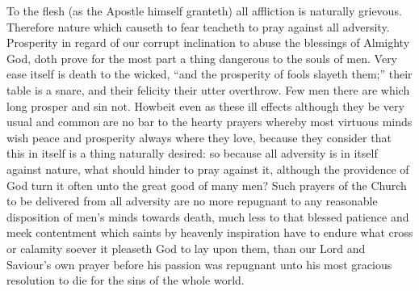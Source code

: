 To the flesh (as the Apostle himself granteth) all affliction is naturally grievous. Therefore nature which causeth to fear teacheth to pray against all adversity. Prosperity in regard of our corrupt inclination to abuse the blessings of Almighty God, doth prove for the most part a thing dangerous to the souls of men. Very ease itself is death to the wicked, “and the prosperity of fools slayeth them;” their table is a snare, and their felicity their utter overthrow. Few men there are which long prosper and sin not. Howbeit even as these ill effects although they be very usual and common are no bar to the hearty prayers whereby most virtuous minds wish peace and prosperity always where they love, because they consider that this in itself is a thing naturally desired: so because all adversity is in itself against nature, what should hinder to pray against it, although the providence of God turn it often unto the great good of many men? Such prayers of the Church to be delivered from all adversity are no more repugnant to any reasonable disposition of men’s minds towards death, much less to that blessed patience and meek contentment which saints by heavenly inspiration have to endure what cross or calamity soever it pleaseth God to lay upon them, than our Lord and Saviour’s own prayer before his passion was repugnant unto his most gracious resolution to die for the sins of the whole world.

